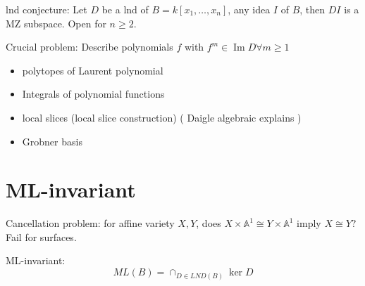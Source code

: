 \documentclass{article}
\begin{document}
lnd conjecture: Let $D$ be a lnd of $B=k[x_{1},\ldots ,x_{n}]$, any idea $I$ of $B$, then $DI$ is a MZ subspace. Open for $n\geqslant 2$.

Crucial problem: Describe polynomials $f$ with $f^{m}\in \operatorname{Im}D \forall m\geqslant 1$  
\begin{itemize}
  \item polytopes of Laurent polynomial
  \item Integrals of polynomial functions
  \item local slices (local slice construction) ( Daigle algebraic explains )
  \item Grobner basis
\end{itemize}

\section{ML-invariant}
Cancellation problem: for affine variety $X,Y$, does $X\times \mathbb{A}^{1}\cong Y\times \mathbb{A}^{1}$ imply $X\cong Y$? Fail for surfaces.

ML-invariant:
\[
  ML(B)= \cap_{D\in LND(B)} \ker D
\]
\end{document}
